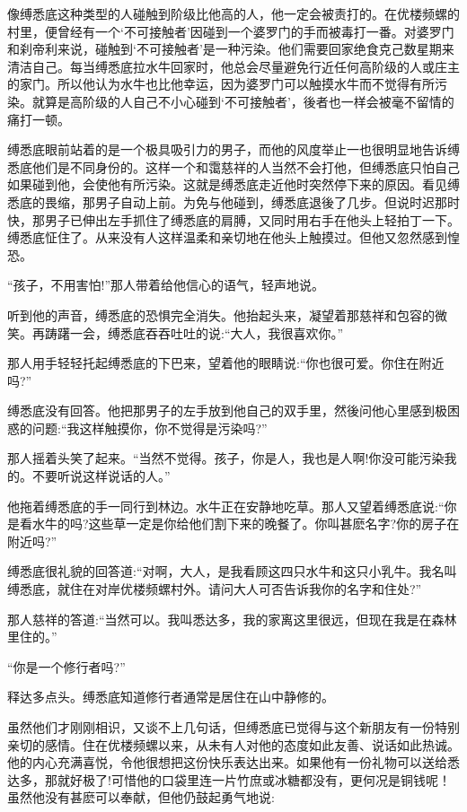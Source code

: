\documentclass[12pt,twoside,openany]{book}
\begin{document}
像缚悉底这种类型的人碰触到阶级比他高的人，他一定会被责打的。在优楼频螺的村里，便曾经有一个‘不可接触者’因碰到一个婆罗门的手而被毒打一番。对婆罗门和刹帝利来说，碰触到‘不可接触者’是一种污染。他们需要回家绝食克己数星期来清洁自己。每当缚悉底拉水牛回家时，他总会尽量避免行近任何高阶级的人或庄主的家门。所以他认为水牛也比他幸运，因为婆罗门可以触摸水牛而不觉得有所污染。就算是高阶级的人自己不小心碰到‘不可接触者’，後者也一样会被毫不留情的痛打一顿。

缚悉底眼前站着的是一个极具吸引力的男子，而他的风度举止一也很明显地告诉缚悉底他们是不同身份的。这样一个和霭慈祥的人当然不会打他，但缚悉底只怕自己如果碰到他，会使他有所污染。这就是缚悉底走近他时突然停下来的原因。看见缚悉底的畏缩，那男子自动上前。为免与他碰到，缚悉底退後了几步。但说时迟那时快，那男子已伸出左手抓住了缚悉底的肩膊，又同时用右手在他头上轻拍丁一下。缚悉底怔住了。从来没有人这样温柔和亲切地在他头上触摸过。但他又忽然感到惶恐。

“孩子，不用害怕!”那人带着给他信心的语气，轻声地说。

听到他的声音，缚悉底的恐惧完全消失。他抬起头来，凝望着那慈祥和包容的微笑。再踌躇一会，缚悉底吞吞吐吐的说:“大人，我很喜欢你。”

那人用手轻轻托起缚悉底的下巴来，望着他的眼睛说:“你也很可爱。你住在附近吗?”

缚悉底没有回答。他把那男子的左手放到他自己的双手里，然後问他心里感到极困惑的问题:“我这样触摸你，你不觉得是污染吗?”

那人摇着头笑了起来。“当然不觉得。孩子，你是人，我也是人啊!你没可能污染我的。不要听说这样说话的人。”

他拖着缚悉底的手一同行到林边。水牛正在安静地吃草。那人又望着缚悉底说:“你是看水牛的吗?这些草一定是你给他们割下来的晚餐了。你叫甚麽名字?你的房子在附近吗?”

缚悉底很礼貌的回答道:“对啊，大人，是我看顾这四只水牛和这只小乳牛。我名叫缚悉底，就住在对岸优楼频螺村外。请问大人可否告诉我你的名字和住处?”

那人慈祥的答道:“当然可以。我叫悉达多，我的家离这里很远，但现在我是在森林里住的。”

“你是一个修行者吗?”

释达多点头。缚悉底知道修行者通常是居住在山中静修的。

虽然他们才刚刚相识，又谈不上几句话，但缚悉底已觉得与这个新朋友有一份特别亲切的感情。住在优楼频螺以来，从未有人对他的态度如此友善、说话如此热诚。他的内心充满喜悦，令他很想把这份快乐表达出来。如果他有一份礼物可以送给悉达多，那就好极了!可惜他的口袋里连一片竹庶或冰糖都没有，更何况是铜钱呢！虽然他没有甚麽可以奉献，但他仍鼓起勇气地说:
\end{document}
